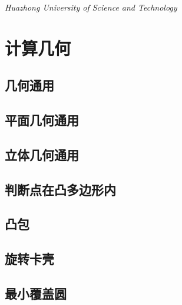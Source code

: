 \documentclass[a4paper]{article}
\begin{document}
\begin{titlepage}
	\vspace{0.5\baselineskip} %
	
	\textit{Huazhong University of Science and Technology} %
	
	\vfill %
	
	
\date{\today}
	

\end{titlepage}
\setcounter{secnumdepth}{0}

\tableofcontents
\newpage
\section{计算几何}
\subsection{几何通用}

\subsection{平面几何通用}

\subsection{立体几何通用}

\subsection{判断点在凸多边形内}

\subsection{凸包}

\subsection{旋转卡壳}

\subsection{最小覆盖圆}

\end{document}
